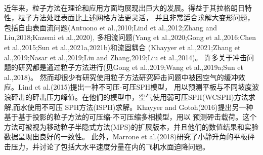 \documentclass[UTF8]{ctexart}
\begin{document}
\paragraph{\quad}近年来，粒子方法在理论和应用方面均展现出巨大的发展。得益于其拉格朗日特性，粒子方法处理表面比上述网格方法更灵活，
                并且非常适合求解大变形问题，包括自由表面流问题(Antuono et al.,2010;Lind et al.,2012;Zhang and Liu,2018;Kazemi et al.,2020),
                多相流问题(Yang et al.,2020;Gong et al.,2016;Chen et al.,2015;Sun et al.,2021a,2021b)和流固耦合
                (Khayyer et al.,2021;Zhang et al.,2019;Nasar et al.,2019;Liu and Zhang,2019;Liu et al.,2014)。
                许多关于冲击问题的研究都是通过粒子方法进行(见Gong et al.,2019;Wang et al.,2019a;Sun et al.,2018)。
                然而却很少有研究使用粒子方法研究砰击问题中被困空气的缓冲效应。Lind et al.(2015)提出一种不可压-可压SPH模型，
                用以预测平板与不同坡度波浪砰击的砰击压力峰值。在他们的模型中，空气使用弱可压SPH(WCSPH)方法求解,而水使用不可压
                SPH方法(ISPH)求解。Khayyer and Gotoh(2016)提出另一种基于基于投影的粒子方法的可压缩-不可压缩多相模型，用以
                预测砰击载荷。这个方法可被视为移动粒子半隐式方法(MPS)的扩展版本，并且他们的数值结果和实验数据呈现出良好的一致性。
                此外，Marrone et al.(2018)研究了小静升角的平板砰击压力，并讨论了包括大水平速度分量在内的飞机水面迫降问题。
\end{document}
